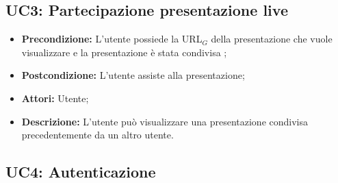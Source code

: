 \subsection{ UC3: Partecipazione presentazione live}

\begin{itemize}
	\item \textbf{Precondizione:} L'utente possiede la URL$_G$ della presentazione che vuole visualizzare e la presentazione è stata condivisa ;
	\item \textbf{Postcondizione:} L'utente assiste alla presentazione;
	\item \textbf{Attori:} Utente;
	\item \textbf{Descrizione:} L'utente può visualizzare una presentazione condivisa precedentemente da un altro utente.
\end{itemize}
\subsection{ UC4: Autenticazione}

